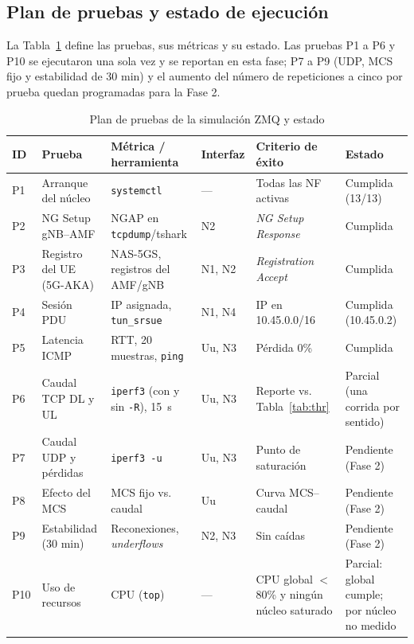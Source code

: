\documentclass[conference]{IEEEtran}
\begin{document}
\subsection{Plan de pruebas y estado de ejecución}
La Tabla~\ref{tab:pruebas} define las pruebas, sus métricas y su estado. Las pruebas P1 a P6 y P10 se ejecutaron una sola vez y se reportan en esta fase; P7 a P9 (UDP, MCS fijo y estabilidad de 30 min) y el aumento del número de repeticiones a cinco por prueba quedan programadas para la Fase 2.

\begin{table}[!t]
\caption{Plan de pruebas de la simulación ZMQ y estado}
\label{tab:pruebas}
\centering
\footnotesize
\renewcommand{\arraystretch}{1.15}
\begin{tabular}{p{0.8cm}p{3.6cm}p{3.5cm}p{1.6cm}p{3.3cm}p{2.6cm}}
\toprule
\textbf{ID} & \textbf{Prueba} & \textbf{Métrica / herramienta} & \textbf{Interfaz} & \textbf{Criterio de éxito} & \textbf{Estado} \\
\midrule
P1 & Arranque del núcleo & \texttt{systemctl} & --- & Todas las NF activas & Cumplida (13/13) \\
P2 & NG Setup gNB--AMF & NGAP en \texttt{tcpdump}/tshark & N2 & \textit{NG Setup Response} & Cumplida \\
P3 & Registro del UE (5G-AKA) & NAS-5GS, registros del AMF/gNB & N1, N2 & \textit{Registration Accept} & Cumplida \\
P4 & Sesión PDU & IP asignada, \texttt{tun\_srsue} & N1, N4 & IP en 10.45.0.0/16 & Cumplida (10.45.0.2) \\
P5 & Latencia ICMP & RTT, 20 muestras, \texttt{ping} & Uu, N3 & Pérdida 0\% & Cumplida \\
P6 & Caudal TCP DL y UL & \texttt{iperf3} (con y sin \texttt{-R}), 15~s & Uu, N3 & Reporte vs. Tabla~\ref{tab:thr} & Parcial (una corrida por sentido) \\
P7 & Caudal UDP y pérdidas & \texttt{iperf3 -u} & Uu, N3 & Punto de saturación & Pendiente (Fase 2) \\
P8 & Efecto del MCS & MCS fijo vs. caudal & Uu & Curva MCS--caudal & Pendiente (Fase 2) \\
P9 & Estabilidad (30 min) & Reconexiones, \textit{underflows} & N2, N3 & Sin caídas & Pendiente (Fase 2) \\
P10 & Uso de recursos & CPU (\texttt{top}) & --- & CPU global $<$ 80\% y ningún núcleo saturado & Parcial: global cumple; por núcleo no medido \\
\bottomrule
\end{tabular}
\end{table}
\end{document}
